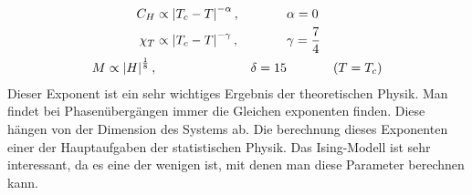 \begin{description}
\begin{align*}
       C_H & \propto \left| T_c - T \right|^{-\alpha}, && \alpha = 0 \\
       \chi_T & \propto \left|  T_c - T \right| ^{-\gamma}, && \gamma = \frac{7}{4} \\
       M \propto \left| H \right|^{\frac{1}{8}}, && \delta = 15 && (T = T_c) \\
     \end{align*}
     Dieser Exponent ist ein sehr wichtiges Ergebnis der theoretischen Physik.
     Man findet bei Phasenübergängen immer die Gleichen exponenten finden.
     Diese hängen von der Dimension des Systems ab. Die berechnung dieses
     Exponenten einer der Hauptaufgaben der statistischen Physik. Das Ising-Modell
     ist sehr interessant, da es eine der wenigen ist, mit denen man diese Parameter
     berechnen kann.
  
\end{description}


